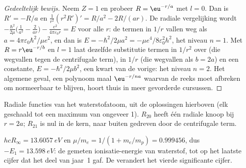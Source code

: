 \begin{proof}[Gedeeltelijk bewijs]
Neem $Z = 1$ en probeer $R = \eu^{-r/a}$ met $l = 0$. Dan is $R' = -R/a$ en
$\frac{1}{r^2}(r^2R')' = R/a^2 - 2R/(ar)$. De radiale vergelijking wordt
$-\frac{\hbar^2}{2\mu}\big(\frac{1}{a^2} - \frac{2}{ar}\big) - \frac{e^2}{4\pi
\varepsilon_0r} = E$ voor alle $r$: de termen in $1/r$ vallen weg als $a =
4\pi\varepsilon_0\hbar^2/\mu e^2$, en dan is $E = -\hbar^2/2\mu a^2 = -\mu
e^4/8\varepsilon_0^2h^2$, het niveau $n = 1$. Met $R = r\eu^{-r/b}$ en $l = 1$
laat dezelfde substitutie termen in $1/r^2$ over (die wegvallen tegen de
centrifugale term), in $1/r$ (die wegvallen als $b = 2a$) en een constante, $E =
-\hbar^2/2\mu b^2$, een kwart van de vorige: het niveau $n = 2$. Het
algemene geval, een polynoom maal $\eu^{-r/na}$ waarvan de reeks moet
afbreken om normeerbaar te blijven, hoort thuis in meer gevorderde
cursussen.
\end{proof}

\begin{omfigure}

{\small Radiale functies van het waterstofatoom, uit de oplossingen
hierboven (elk geschaald tot een maximum van ongeveer 1). $R_{20}$ heeft
één radiale knoop bij $r = 2a$; $R_{21}$ is nul in de kern, naar buiten
gedreven door de centrifugale term.}
\end{omfigure}

\begin{example}\label{ex:b3:quantum-model-systems:ie}
$hcR_\infty = \qty{13.6057}{eV}$ en $\mu/m_e = 1/(1 + m_e/m_p) = 0.999456$, dus
$-E_1 = \qty{13.598}{eV}$: de gemeten ionisatie-energie van waterstof, tot
op het laatste cijfer dat het deel van jaar~1 gaf. De 
verandert het vierde significante cijfer.
\end{example}

